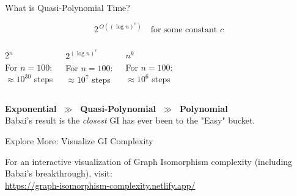 \documentclass[10pt, aspectratio=169]{beamer}
\begin{document}
\begin{frame}{What is \alert{Quasi-Polynomial} Time?}
	\begin{tcolorbox}[defbox, title={Babai's Algorithm Runs in Time:}]
		\[
			2^{\,O\!\left((\log n)^c\right)}
			\quad \text{for some constant } c
		\]
	\end{tcolorbox}

	\begin{columns}[T]
		\begin{tcolorbox}[redbox, title={Exponential (Old)}]
			\centering $2^n$\\
			\small For $n=100$:\\$\approx 10^{30}$ steps
		\end{tcolorbox}

		\begin{tcolorbox}[defbox, title={Quasi-Poly (Babai)}]
			\centering $2^{(\log n)^c}$\\
			\small For $n=100$:\\$\approx 10^{7}$ steps
		\end{tcolorbox}

		\begin{tcolorbox}[greenbox, title={Polynomial (Goal)}]
			\centering $n^k$\\
			\small For $n=100$:\\$\approx 10^{6}$ steps
		\end{tcolorbox}
	\end{columns}

	\begin{tcolorbox}[keybox]
		\centering
		\textbf{Exponential} $\;\gg\;$ \textbf{Quasi-Polynomial} $\;\gg\;$ \textbf{Polynomial}\\[0.2em]
		Babai's result is the \textit{closest} GI has ever been to the "Easy" bucket.
	\end{tcolorbox}

\end{frame}

\begin{frame}{Explore More: Visualize GI Complexity}
	\begin{tcolorbox}[greenbox, title={Explore More}]
		\small
		For an interactive visualization of Graph Isomorphism complexity (including Babai's breakthrough), visit:
		\\
		\href{https://graph-isomorphism-complexity.netlify.app/}{https://graph-isomorphism-complexity.netlify.app/}
	\end{tcolorbox}
\end{frame}
\end{document}

